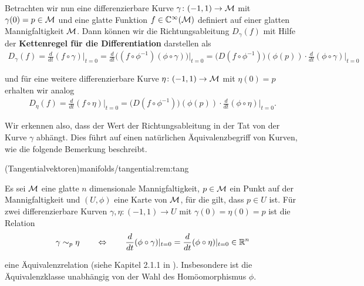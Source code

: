 \par
Betrachten wir nun eine differenzierbare Kurve \(\gamma \colon (-1, 1) \rightarrow \mathcal{M}\) mit \(\gamma(0)=p \in \mathcal{M}\) und eine glatte Funktion \(f \in \mathbb{C}^\infty(\mathcal{M})\) definiert auf einer glatten Mannigfaltigkeit \(\mathcal{M}\).
Dann können wir die Richtungsableitung \(D_\gamma(f)\) mit Hilfe der \textbf{Kettenregel für die Differentiation} darstellen als
\begin{align*}
D_\gamma(f) = \frac{d}{dt}(f\circ \gamma)\big\rvert_{t=0} = \frac{d}{dt}\big( (f\circ \phi^{-1}) (\phi \circ \gamma) \big)\rvert_{t=0} = 
\big(D(f\circ \phi^{-1})\big)(\phi(p))\cdot \frac{d}{dt}(\phi \circ \gamma)\rvert_{t=0}
\end{align*}
\par
und für eine weitere differenzierbare Kurve \(\eta \colon (-1, 1) \rightarrow \mathcal{M}\) mit \(\eta(0)=p\) erhalten wir analog
\begin{align*}
D_\eta(f) = \frac{d}{dt}(f\circ \eta)\big\rvert_{t=0} = 
\big(D(f\circ \phi^{-1})\big)(\phi(p))\cdot \frac{d}{dt}(\phi \circ \eta)\rvert_{t=0}.
\end{align*}
\par
Wir erkennen also, dass der Wert der Richtungsableitung in der Tat von der Kurve \(\gamma\) abhängt.
Dies führt auf einen natürlichen Äquivalenzbegriff von Kurven, wie die folgende Bemerkung beschreibt.
\begin{remark}{(Tangentialvektoren)}{manifolds/tangential:rem:tang}



\par
Es sei \(\mathcal{M}\) eine glatte \(n\) dimensionale Mannigfaltigkeit, \(p\in\mathcal{M}\) ein Punkt auf der Mannigfaltigkeit und \((U,\phi)\) eine Karte von \(\mathcal{M}\), für die gilt, dass \(p\in U\) ist.
Für zwei differenzierbare Kurven \(\gamma, \eta:(-1,1) \to U\) mit \(\gamma(0) = \eta(0) = p\) ist die Relation
\begin{align*}
\gamma \sim_p \eta
\qquad \Leftrightarrow \qquad
\frac{d}{dt}(\phi \circ \gamma)\rvert_{t=0} = \frac{d}{dt}(\phi \circ \eta)\rvert_{t=0}\in \mathbb{R}^n
\end{align*}
\par
eine Äquivalenzrelation (siehe Kapitel 2.1.1 in \cite{Bur20}).
Insbesondere ist die Äquivalenzklasse unabhängig von der Wahl des Homöomorphismus \(\phi\).
\end{remark}

